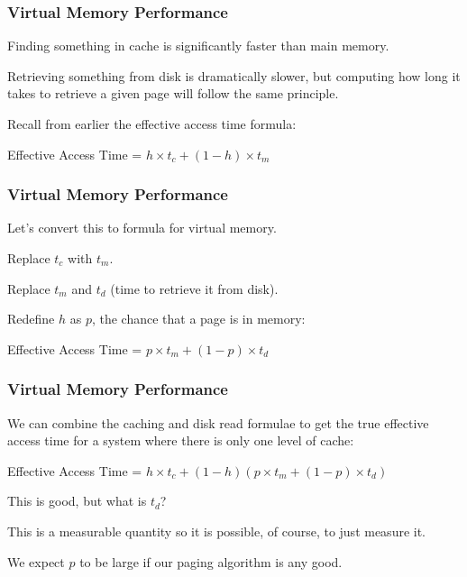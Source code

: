 \begin{frame}
\frametitle{Virtual Memory Performance}

Finding something in cache is significantly faster than main memory. 

Retrieving something from disk is dramatically slower, but computing how long it takes to retrieve a given page will follow the same principle. 

Recall from earlier the effective access time formula:

\begin{center}
	Effective Access Time = $ h \times t_{c} + (1 - h) \times t_{m}$
\end{center}


\end{frame}

\begin{frame}
\frametitle{Virtual Memory Performance}

Let's convert this to formula for virtual memory.

Replace $t_{c}$ with $t_{m}$.

Replace $t_{m}$ and $t_{d}$ (time to retrieve it from disk).

Redefine $h$ as $p$, the chance that a page is in memory:

\begin{center}
	Effective Access Time = $ p \times t_{m} + (1 - p) \times t_{d}$
\end{center}

\end{frame}



\begin{frame}
\frametitle{Virtual Memory Performance}

We can combine the caching and disk read formulae to get the true effective access time for a system where there is only one level of cache:

\begin{center}
	Effective Access Time = $ h \times t_{c} + (1 - h) ( p \times t_{m} + (1 - p) \times t_{d})$
\end{center}

This is good, but what is $t_{d}$? 

This is a measurable quantity so it is possible, of course, to just measure it.

We expect $p$ to be large if our paging algorithm is any good.

\end{frame}



